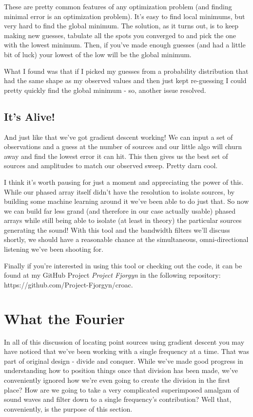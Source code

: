 \documentclass[10pt,a5paper]{book}
\begin{document}
These are pretty common features of any optimization problem (and finding minimal error is an optimization problem). It's easy to find local minimums, but very hard to find the global minimum. The solution, as it turns out, is to keep making new guesses, tabulate all the spots you converged to and pick the one with the lowest minimum. Then, if you've made enough guesses (and had a little bit of luck) your lowest of the low will be the global minimum. 

What I found was that if I picked my guesses from a probability distribution that had the same shape as my observed values and then just kept re-guessing I could pretty quickly find the global minimum - so, another issue resolved. 

\section{It's Alive!}

And just like that we've got gradient descent working! We can input a set of observations and a guess at the number of sources and our little algo will churn away and find the lowest error it can hit. This then gives us the best set of sources and amplitudes to match our observed sweep. Pretty darn cool. 

I think it's worth pausing for just a moment and appreciating the power of this. While our phased array itself didn't have the resolution to isolate sources, by building some machine learning around it we've been able to do just that. So now we can build far less grand (and therefore in our case actually usable) phased arrays while still being able to isolate (at least in theory) the particular sources generating the sound! With this tool and the bandwidth filters we'll discuss shortly, we should have a reasonable chance at the simultaneous, omni-directional listening we've been shooting for. 

Finally if you're interested in using this tool or checking out the code, it can be found at my GitHub Project \textit{Project Fjorgyn} in the following repository: https://github.com/Project-Fjorgyn/croac.

\newpage

\chapter{What the Fourier}
In all of this discussion of locating point sources using gradient descent you may have noticed that we've been working with a single frequency at a time. That was part of original design - divide and conquer. While we've made good progress in understanding how to position things once that division has been made, we've conveniently ignored how we're even going to create the division in the first place? How are we going to take a very complicated superimposed amalgam of sound waves and filter down to a single frequency's contribution? Well that, conveniently, is the purpose of this section.
\end{document}
